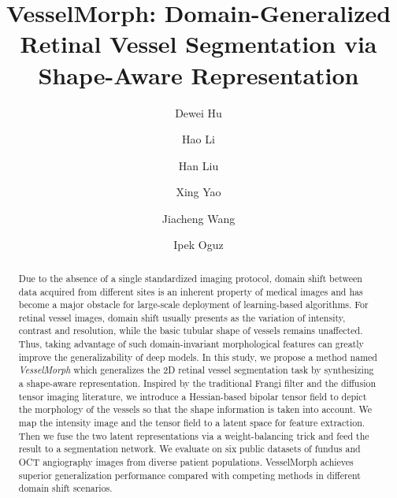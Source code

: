 \documentclass[runningheads]{llncs}
\begin{document}
%
\title{VesselMorph: Domain-Generalized Retinal Vessel Segmentation via Shape-Aware Representation}
%
%
\author{Dewei Hu\and
Hao Li \and
Han Liu \and
Xing Yao \and
Jiacheng Wang \and
Ipek Oguz}

%

\maketitle              %
%
\begin{abstract}
Due to the absence of a single standardized imaging protocol, domain shift between data acquired from different sites is an inherent property of medical images and has become a major obstacle for large-scale deployment of learning-based algorithms. For retinal vessel images, domain shift usually presents as the variation of intensity, contrast and resolution, while the basic tubular shape of vessels remains unaffected. Thus, taking advantage of such domain-invariant morphological features can greatly improve the generalizability of deep models. In this study, we propose a method named \textit{VesselMorph} which generalizes the 2D retinal vessel segmentation task by synthesizing a shape-aware representation. Inspired by the traditional Frangi filter and the diffusion tensor imaging literature, we introduce a Hessian-based bipolar tensor field to depict the morphology of the vessels so that the shape information is taken into account. We map the intensity image and the tensor field to a latent space for feature extraction. Then we fuse the two latent representations via a weight-balancing trick and feed the result to a segmentation network. We  evaluate on six public datasets of fundus and OCT angiography images from diverse patient populations. VesselMorph achieves superior generalization performance compared with competing methods in different domain shift scenarios.


\end{abstract}
%
%
%
\end{document}
